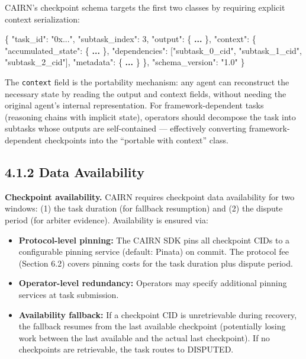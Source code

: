 \documentclass[
  10pt,
]{article}
\newenvironment{Shaded}{}{}
\newcommand{\DataTypeTok}[1]{\textcolor[rgb]{0.56,0.13,0.00}{#1}}
\newcommand{\DecValTok}[1]{\textcolor[rgb]{0.25,0.63,0.44}{#1}}
\newcommand{\ErrorTok}[1]{\textcolor[rgb]{1.00,0.00,0.00}{\textbf{#1}}}
\newcommand{\FunctionTok}[1]{\textcolor[rgb]{0.02,0.16,0.49}{#1}}
\newcommand{\OtherTok}[1]{\textcolor[rgb]{0.00,0.44,0.13}{#1}}
\newcommand{\StringTok}[1]{\textcolor[rgb]{0.25,0.44,0.63}{#1}}
\providecommand{\tightlist}{%
  \setlength{\itemsep}{0pt}\setlength{\parskip}{0pt}}
\begin{document}
CAIRN's checkpoint schema targets the first two classes by requiring
explicit context serialization:

\begin{Shaded}
\begin{Highlighting}[]
\FunctionTok{\{}
  \DataTypeTok{"task\_id"}\FunctionTok{:} \StringTok{"0x..."}\FunctionTok{,}
  \DataTypeTok{"subtask\_index"}\FunctionTok{:} \DecValTok{3}\FunctionTok{,}
  \DataTypeTok{"output"}\FunctionTok{:} \FunctionTok{\{} \ErrorTok{...} \FunctionTok{\},}
  \DataTypeTok{"context"}\FunctionTok{:} \FunctionTok{\{}
    \DataTypeTok{"accumulated\_state"}\FunctionTok{:} \FunctionTok{\{} \ErrorTok{...} \FunctionTok{\},}
    \DataTypeTok{"dependencies"}\FunctionTok{:} \OtherTok{[}\StringTok{"subtask\_0\_cid"}\OtherTok{,} \StringTok{"subtask\_1\_cid"}\OtherTok{,} \StringTok{"subtask\_2\_cid"}\OtherTok{]}\FunctionTok{,}
    \DataTypeTok{"metadata"}\FunctionTok{:} \FunctionTok{\{} \ErrorTok{...} \FunctionTok{\}}
  \FunctionTok{\},}
  \DataTypeTok{"schema\_version"}\FunctionTok{:} \StringTok{"1.0"}
\FunctionTok{\}}
\end{Highlighting}
\end{Shaded}

The \texttt{context} field is the portability mechanism: any agent can
reconstruct the necessary state by reading the output and context
fields, without needing the original agent's internal representation.
For framework-dependent tasks (reasoning chains with implicit state),
operators should decompose the task into subtasks whose outputs are
self-contained --- effectively converting framework-dependent
checkpoints into the ``portable with context'' class.

\hypertarget{data-availability}{%
\subsection{4.1.2 Data Availability}\label{data-availability}}

\textbf{Checkpoint availability.} CAIRN requires checkpoint data
availability for two windows: (1) the task duration (for fallback
resumption) and (2) the dispute period (for arbiter evidence).
Availability is ensured via:

\begin{itemize}
\tightlist
\item
  \textbf{Protocol-level pinning:} The CAIRN SDK pins all checkpoint
  CIDs to a configurable pinning service (default: Pinata) on commit.
  The protocol fee (Section 6.2) covers pinning costs for the task
  duration plus dispute period.
\item
  \textbf{Operator-level redundancy:} Operators may specify additional
  pinning services at task submission.
\item
  \textbf{Availability fallback:} If a checkpoint CID is unretrievable
  during recovery, the fallback resumes from the last available
  checkpoint (potentially losing work between the last available and the
  actual last checkpoint). If no checkpoints are retrievable, the task
  routes to DISPUTED.
\end{itemize}
\end{document}
